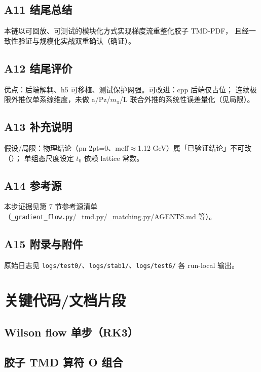 \documentclass[UTF8]{ctexart}
\begin{document}
\subsection{A11 结尾总结}
本链以可回放、可测试的模块化方式实现梯度流重整化胶子 TMD-PDF，
且经一致性验证与规模化实战双重确认（\textcolor{struct}{确证}）。

\subsection{A12 结尾评价}
优点：后端解耦、h5 可移植、测试保护网强。可改进：cpp 后端仅占位；
连续极限外推仅单系综维度，未做 a/Pz/$m_\pi$/L 联合外推的系统性误差量化（见局限）。

\subsection{A13 补充说明}
假设/局限：物理结论（pn 2pt=0、meff$\approx$1.12 GeV）属「已验证结论」不可改（\textcolor{evidence}{\texttt{}}）；
单组态尺度设定 $t_0$ 依赖 lattice 常数。

\subsection{A14 参考源}
本步证据见第 7 节参考源清单（\texttt{\_gradient\_flow.py}/\_tmd.py/\_matching.py/AGENTS.md 等）。

\subsection{A15 附录与附件}
原始日志见 \texttt{logs/test0/}、\texttt{logs/stab1/}、\texttt{logs/test6/} 各 run-local 输出。

\section{关键代码/文档片段}
\subsection{Wilson flow 单步（RK3）}


\subsection{胶子 TMD 算符 O 组合}

\end{document}

